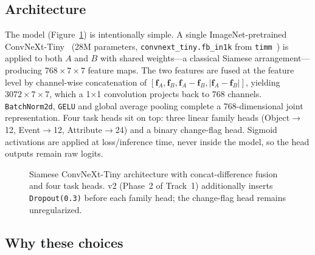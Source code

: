 \documentclass[journal]{IEEEtran}
\begin{document}
\subsection{Architecture}\label{ssec:arch}

The model (Figure~\ref{fig:architecture}) is intentionally simple. A single ImageNet-pretrained ConvNeXt-Tiny~\cite{liu2022convnext} (28M parameters, \texttt{convnext\_tiny.fb\_in1k} from \texttt{timm}~\cite{wightman2019timm}) is applied to both $A$ and $B$ with shared weights---a classical Siamese arrangement---producing $768{\times}7{\times}7$ feature maps. The two features are fused at the feature level by channel-wise concatenation of $[\mathbf{f}_A,\mathbf{f}_B,\mathbf{f}_A{-}\mathbf{f}_B,|\mathbf{f}_A{-}\mathbf{f}_B|]$, yielding $3072{\times}7{\times}7$, which a 1$\times$1 convolution projects back to 768 channels. \texttt{BatchNorm2d}, \texttt{GELU} and global average pooling complete a 768-dimensional joint representation. Four task heads sit on top: three linear family heads (Object$\to$12, Event$\to$12, Attribute$\to$24) and a binary change-flag head. Sigmoid activations are applied at loss/inference time, never inside the model, so the head outputs remain raw logits.

\begin{figure}[!t]
  \centering
  \caption{Siamese ConvNeXt-Tiny architecture with concat-difference fusion and four task heads. v2 (Phase~2 of Track~1) additionally inserts \texttt{Dropout(0.3)} before each family head; the change-flag head remains unregularized.}
  \label{fig:architecture}
\end{figure}

\subsection{Why these choices}\label{ssec:why}
\end{document}
